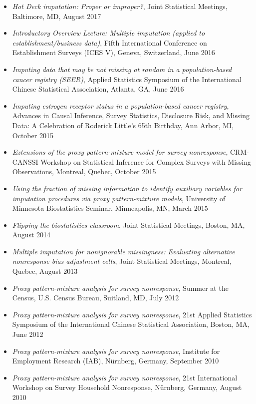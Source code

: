 \documentclass[
  english,
  letterpaper,
  DIV=11,
  numbers=noendperiod]{scrartcl}
\begin{document}
\begin{itemize}
{  multi-mode survey}, Survey Research Center PRS Seminar Series,
  University of Michigan, Ann Arbor, MI, March 2019
\item
  \emph{Hot Deck imputation: Proper or improper?}, Joint Statistical
  Meetings, Baltimore, MD, August 2017
\item
  \emph{Introductory Overview Lecture: Multiple imputation (applied to
  establishment/business data)}, Fifth International Conference on
  Establishment Surveys (ICES V), Geneva, Switzerland, June 2016
\item
  \emph{Imputing data that may be not missing at random in a
  population-based cancer registry (SEER)}, Applied Statistics Symposium
  of the International Chinese Statistical Association, Atlanta, GA,
  June 2016
\item
  \emph{Imputing estrogen receptor status in a population-based cancer
  registry}, Advances in Causal Inference, Survey Statistics, Disclosure
  Risk, and Missing Data: A Celebration of Roderick Little's 65th
  Birthday, Ann Arbor, MI, October 2015
\item
  \emph{Extensions of the proxy pattern-mixture model for survey
  nonresponse}, CRM-CANSSI Workshop on Statistical Inference for Complex
  Surveys with Missing Observations, Montreal, Quebec, October 2015
\item
  \emph{Using the fraction of missing information to identify auxiliary
  variables for imputation procedures via proxy pattern-mixture models},
  University of Minnesota Biostatistics Seminar, Minneapolis, MN, March
  2015
\item
  \emph{Flipping the biostatistics classroom}, Joint Statistical
  Meetings, Boston, MA, August 2014
\item
  \emph{Multiple imputation for nonignorable missingness: Evaluating
  alternative nonresponse bias adjustment cells}, Joint Statistical
  Meetings, Montreal, Quebec, August 2013
\item
  \emph{Proxy pattern-mixture analysis for survey nonresponse}, Summer
  at the Census, U.S. Census Bureau, Suitland, MD, July 2012
\item
  \emph{Proxy pattern-mixture analysis for survey nonresponse}, 21st
  Applied Statistics Symposium of the International Chinese Statistical
  Association, Boston, MA, June 2012
\item
  \emph{Proxy pattern-mixture analysis for survey nonresponse},
  Institute for Employment Research (IAB), Nürnberg, Germany, September
  2010
\item
  \emph{Proxy pattern-mixture analysis for survey nonresponse}, 21st
  International Workshop on Survey Household Nonresponse, Nürnberg,
  Germany, August 2010
\end{itemize}
\end{document}
